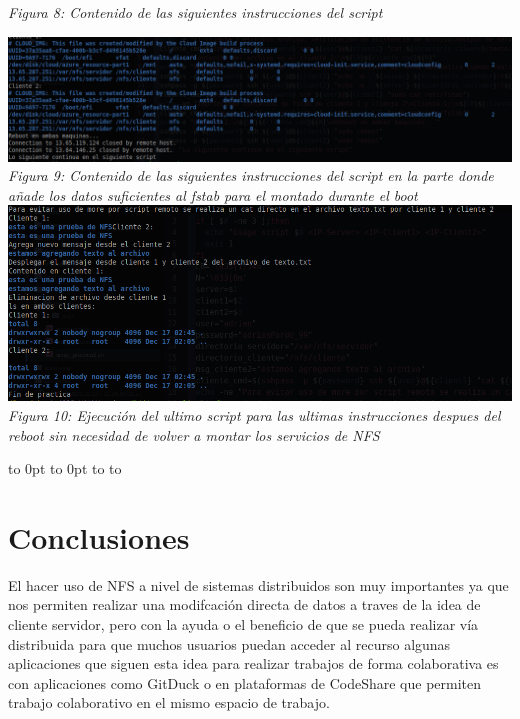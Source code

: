 \documentclass[10pt,executivepaper]{article}
\def\fillandplacepagenumber{%
 \par\pagestyle{empty}%
 \vbox to 0pt{\vss}\vfill
 \vbox to 0pt{\baselineskip0pt
   \hbox to\linewidth{\hss}%
   \baselineskip\footskip
   \hbox to\linewidth{%
     \hfil\thepage\hfil}\vss}}
\begin{document}
\begin{center}
  \textit{Figura 8: Contenido de las siguientes instrucciones del script}\\
  \begin{landscape}
    \includegraphics[scale=0.5]{imgs/boot_part.png}\\
    \textit{Figura 9: Contenido de las siguientes instrucciones del script en la parte donde añade los datos suficientes al fstab para el montado durante el boot}\\
    \includegraphics[scale=0.5]{imgs/script_final.png}\\
    \textit{Figura 10: Ejecución del ultimo script para las ultimas instrucciones despues del reboot sin necesidad de volver a montar los servicios de NFS}\\
    \fillandplacepagenumber
  \end{landscape}
\end{center}
\section{Conclusiones}
El hacer uso de NFS a nivel de sistemas distribuidos son muy importantes ya que nos permiten realizar una modifcación directa de datos a traves de la idea de cliente servidor, pero con la ayuda o el beneficio de que se pueda realizar vía distribuida para que muchos usuarios puedan acceder al recurso algunas aplicaciones que siguen esta idea para realizar trabajos de forma colaborativa es con aplicaciones como GitDuck o en plataformas de CodeShare que permiten trabajo colaborativo en el mismo espacio de trabajo.
\end{document}
